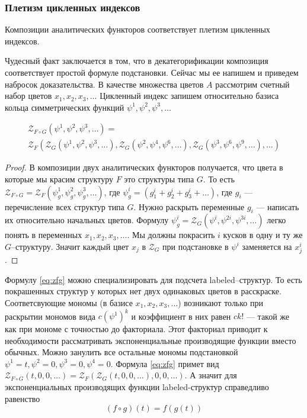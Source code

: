 \subsubsection{Плетизм цикленных индексов}
\begin{theorem}
Композиции аналитических функторов соответствует плетизм цикленных
индексов.
\end{theorem}
Чудесный факт заключается в том, что в декатегорификации
композиция соответствует простой формуле подстановки. Сейчас мы ее напишем и
приведем набросок доказательства. В качестве множества цветов $A$ рассмотрим
счетный набор цветов $x_1, x_2, x_3, \dots$ Цикленный индекс запишем
относительно базиса кольца симметрических функций $\psi^1, \psi^2, \psi^3, \dots$
\begin{statement}
\label{th:compos}
\begin{multline}
\label{eq:zfg}
	\mathcal Z_{F \circ G} (\psi^1, \psi^2, \psi^3, \dots) = \\
	\mathcal Z_F(
		\mathcal Z_G(\psi^1, \psi^2, \psi^3, \dots),
		\mathcal Z_G(\psi^2, \psi^4, \psi^6, \dots),
		\mathcal Z_G(\psi^3, \psi^6, \psi^9, \dots),
		\dots
	)
\end{multline}
\end{statement}
\begin{proof}
В композиции двух аналитических функторов получается, что цвета в которые мы
красим структуру $F$ это структуры типа $G$. То есть $\mathcal Z_{F \circ G} =
\mathcal Z_F(\psi_g^1, \psi_g^2, \psi_g^3, \dots)$, где $\psi_g^i = (g_1^i +
g_2^i + g_3^i + \dots)$, где $g_i$ --- перечисление всех структур типа $G$.
Нужно раскрыть переменные $g_i $ --- написать их относительно начальных цветов.
Формулу $\psi_g^i = \mathcal Z_G(\psi^i, \psi^{2i}, \psi^{3i}, \dots)$ легко
понять в переменных $x_1, x_2, x_3, \dots$. Мы должны покрасить $i$ кусков в
одну и ту же $G$--структуру. Значит каждый цвет $x_j$ в $\mathcal Z_G$ при
подстановке в $\psi^i$ заменяется на $x_j^i$.
\end{proof}
\begin{remark}
Формулу \ref{eq:zfg} можно специализировать для подсчета labeled--структур. То
есть покрашенных структур у которых нет двух одинаковых цветов в расскраске.
Соответсвующие мономы (в базисе $x_1, x_2, x_3, \dots$) возникают только при
раскрытии мономов вида $c(\psi^1)^k$ и коэффициент в них равен $ck!$ --- такой
же как при мономе с точностью до факториала. Этот факториал приводит к
необходимости рассматривать экспоненциальные производящие функции вместо
обычных. Можно занулить все остальные мономы подстановкой $\psi^1 = t, \psi^2 =
0, \psi^3 = 0, \psi^4 = 0$. Формула \ref{eq:zfg} примет вид $
\mathcal Z_{F \circ G} (t, 0, 0, \dots) =
	\mathcal Z_F(
		\mathcal Z_G(t, 0, 0, \dots), 0, 0, \dots
	)
$.
А значит для экспоненциальных производящих функции labeled-структур справедливо
равенство
\begin{equation}
\label{eq:comp}
(f \circ g) (t) = f(g(t))
\end{equation}
\end{remark}


